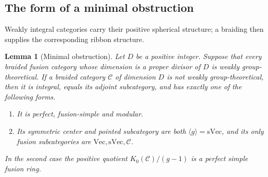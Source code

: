 \documentclass[11pt,a4paper]{article}
\numberwithin{equation}{section}
\newtheorem{lemma}[theorem]{Lemma}
\begin{document}
\subsection{The form of a minimal obstruction}
Weakly integral categories carry their positive spherical
structure; a braiding then supplies the corresponding ribbon structure.

\begin{lemma}[Minimal obstruction]\label{loc:minimal}
Let $D$ be a positive integer. Suppose that every braided fusion category
whose dimension is a proper divisor of $D$ is weakly group-theoretical.
If a braided category
$\mathcal C$ of dimension $D$ is not weakly group-theoretical, then it is
integral, equals its adjoint subcategory, and has exactly one of the
following forms.
\begin{enumerate}
\item It is perfect, fusion-simple and modular.
\item Its symmetric center and pointed subcategory are both
$\langle g\rangle=\mathrm{sVec}$, and its only fusion subcategories are
$\mathrm{Vec},\mathrm{sVec},\mathcal C$.
\end{enumerate}
In the second case the positive quotient
$K_0(\mathcal C)/(g-1)$ is a perfect simple fusion ring.
\end{lemma}
\end{document}
